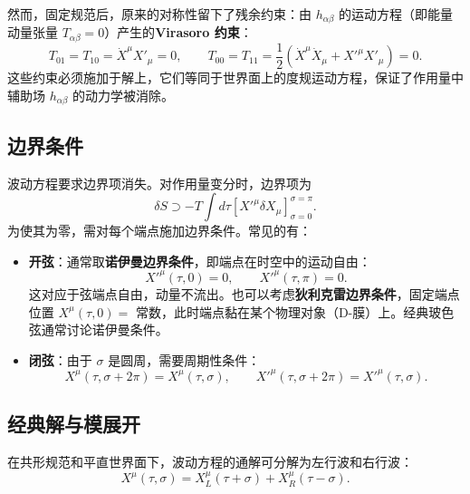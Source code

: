 然而，固定规范后，原来的对称性留下了残余约束：由 $h_{\alpha\beta}$ 的运动方程（即能量动量张量 $T_{\alpha\beta}=0$）产生的\textbf{Virasoro 约束}：
\begin{equation}
T_{01} = T_{10} = \dot{X}^\mu X'_\mu = 0,\qquad T_{00} = T_{11} = \frac12 \left( \dot{X}^\mu \dot{X}_\mu + X'^\mu X'_\mu \right) = 0.
\end{equation}
这些约束必须施加于解上，它们等同于世界面上的度规运动方程，保证了作用量中辅助场 $h_{\alpha\beta}$ 的动力学被消除。

\subsection*{边界条件}

波动方程要求边界项消失。对作用量变分时，边界项为
\begin{equation}
\delta S \supset -T \int d\tau \left[ X'^\mu \delta X_\mu \right]_{\sigma=0}^{\sigma=\pi}.
\end{equation}
为使其为零，需对每个端点施加边界条件。常见的有：

\begin{itemize}
    \item \textbf{开弦}：通常取\textbf{诺伊曼边界条件}，即端点在时空中的运动自由：
    \begin{equation}
    X'^\mu(\tau,0) = 0,\qquad X'^\mu(\tau,\pi) = 0.
    \end{equation}
    这对应于弦端点自由，动量不流出。也可以考虑\textbf{狄利克雷边界条件}，固定端点位置 $X^\mu(\tau,0)=$ 常数，此时端点黏在某个物理对象（D-膜）上。经典玻色弦通常讨论诺伊曼条件。
    \item \textbf{闭弦}：由于 $\sigma$ 是圆周，需要周期性条件：
    \begin{equation}
    X^\mu(\tau,\sigma+2\pi) = X^\mu(\tau,\sigma),\qquad X'^\mu(\tau,\sigma+2\pi) = X'^\mu(\tau,\sigma).
    \end{equation}
\end{itemize}

\subsection*{经典解与模展开}

在共形规范和平直世界面下，波动方程的通解可分解为左行波和右行波：
\begin{equation}
X^\mu(\tau,\sigma) = X^\mu_L(\tau+\sigma) + X^\mu_R(\tau-\sigma).
\end{equation}

